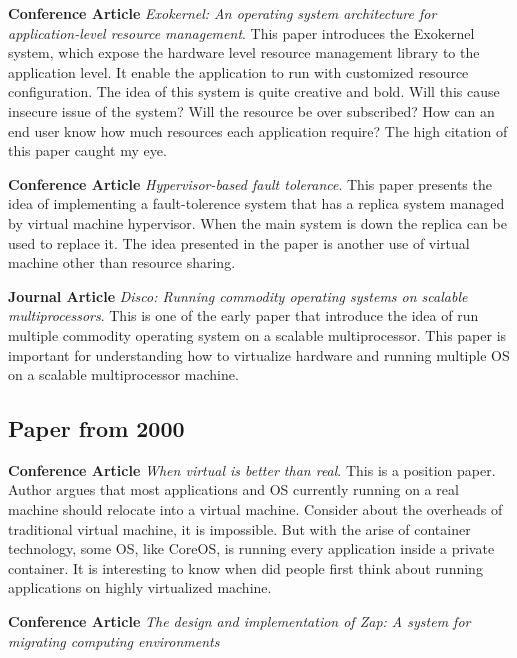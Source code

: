 \documentclass{article}
\begin{document}
\textbf{Conference Article} \emph{Exokernel: An operating system architecture for application-level 
resource management}\cite{engler1995exokernel}. This paper introduces the Exokernel system, which 
expose the hardware level resource management library to the application level. It enable the 
application to run with customized resource configuration. The idea of this system is quite 
creative and bold. Will this cause insecure issue of the system? Will the resource be over 
subscribed? How can an end user know how much resources each application require? The high 
citation of this paper caught my eye.

\medskip

\textbf{Conference Article} \emph{Hypervisor-based fault tolerance}\cite{bressoud1995hypervisor}.
This paper presents the idea of implementing a fault-tolerence system that has a replica system 
managed by virtual machine hypervisor. When the main system is down the replica can be used to 
replace it. The idea presented in the paper is another use of virtual machine other than 
resource sharing.

\medskip 

\textbf{Journal Article} \emph{Disco: Running commodity operating systems on scalable 
multiprocessors}\cite{bugnion1997disco}. This is one of the early paper that introduce the 
idea of run multiple commodity operating system on a scalable multiprocessor. This paper is 
important for understanding how to virtualize hardware and running multiple OS on a scalable 
multiprocessor machine.

\subsection{Paper from 2000}

\textbf{Conference Article} \emph{When virtual is better than real}\cite{chen2001virtual}. This is
a position paper. Author argues that most applications and OS currently running on a real machine 
should relocate into a virtual machine. Consider about the overheads of traditional virtual machine,
it is impossible. But with the arise of container technology, some OS, like CoreOS, is running 
every application inside a private container. It is interesting to know when did people first think 
about running applications on highly virtualized machine.

\medskip

\textbf{Conference Article} \emph{The design and implementation of Zap: A system for migrating 
computing environments}\cite{osman2002design}
\end{document}
